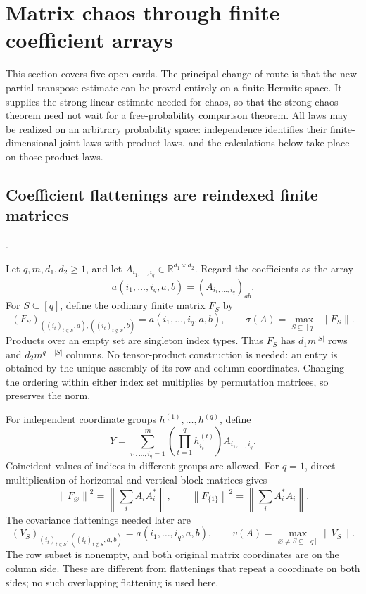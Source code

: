 \documentclass[11pt,a4paper]{article}
\newcommand{\R}{\mathbb R}
\newcommand{\norm}[1]{\left\lVert#1\right\rVert}
\DeclareRobustCommand{\code}[1]{{\footnotesize\urlstyle{tt}\nolinkurl{#1}}}
\begin{document}
\section{Matrix chaos through finite coefficient arrays}

This section covers five open cards.  The principal change of route is that
the new partial-transpose estimate can be proved entirely on a finite
Hermite space.  It supplies the strong linear estimate needed for chaos,
so that the strong chaos theorem need not wait for a free-probability
comparison theorem.  All laws may be realized on an arbitrary probability
space: independence identifies their finite-dimensional joint laws with
product laws, and the calculations below take place on those product laws.

\subsection{Coefficient flattenings are reindexed finite matrices}
\label{route:matrix-chaos-flattenings-def}
\noindent\code{matrix-chaos-flattenings-def}.

Let $q,m,d_1,d_2\geq1$, and let
$A_{i_1,\ldots,i_q}\in\R^{d_1\times d_2}$.  Regard the coefficients as the
array
\[
 a(i_1,\ldots,i_q,a,b)=(A_{i_1,\ldots,i_q})_{ab}.
\]
For $S\subseteq[q]$, define the ordinary finite matrix $F_S$ by
\[
 (F_S)_{((i_t)_{t\in S},a),((i_t)_{t\notin S},b)}
       =a(i_1,\ldots,i_q,a,b),\qquad
 \sigma(A)=\max_{S\subseteq[q]}\norm{F_S}.
\]
Products over an empty set are singleton index types.  Thus $F_S$ has
$d_1m^{|S|}$ rows and $d_2m^{q-|S|}$ columns.  No tensor-product
construction is needed: an entry is obtained by the unique assembly of
its row and column coordinates.  Changing the ordering within either
index set multiplies by permutation matrices, so preserves the norm.

For independent coordinate groups $h^{(1)},\ldots,h^{(q)}$, define
\[
 Y=\sum_{i_1,\ldots,i_q=1}^m
       \left(\prod_{t=1}^q h^{(t)}_{i_t}\right)A_{i_1,\ldots,i_q}.
\]
Coincident values of indices in different groups are allowed.  For $q=1$,
direct multiplication of horizontal and vertical block matrices gives
\[
 \norm{F_\varnothing}^2=\left\|\sum_iA_iA_i^*\right\|,
 \qquad
 \norm{F_{\{1\}}}^2=\left\|\sum_iA_i^*A_i\right\|.
\]
The covariance flattenings needed later are
\[
 (V_S)_{(i_t)_{t\in S},((i_t)_{t\notin S},a,b)}
       =a(i_1,\ldots,i_q,a,b),\qquad
 v(A)=\max_{\varnothing\ne S\subseteq[q]}\norm{V_S}.
\]
The row subset is nonempty, and both original matrix coordinates are on
the column side.  These are different from flattenings that repeat a
coordinate on both sides; no such overlapping flattening is used here.
\end{document}
